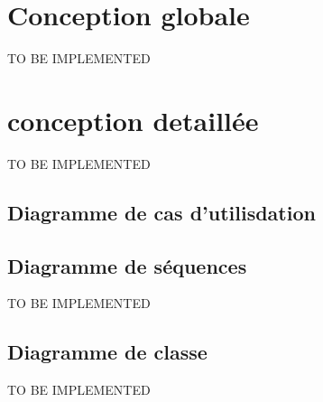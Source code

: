 \section{Conception globale}
TO BE IMPLEMENTED
\section{conception detaillée}
TO BE IMPLEMENTED
\subsection{Diagramme de cas d'utilisdation}



\subsection{Diagramme de séquences}
TO BE IMPLEMENTED
\subsection{Diagramme de classe}
TO BE IMPLEMENTED
